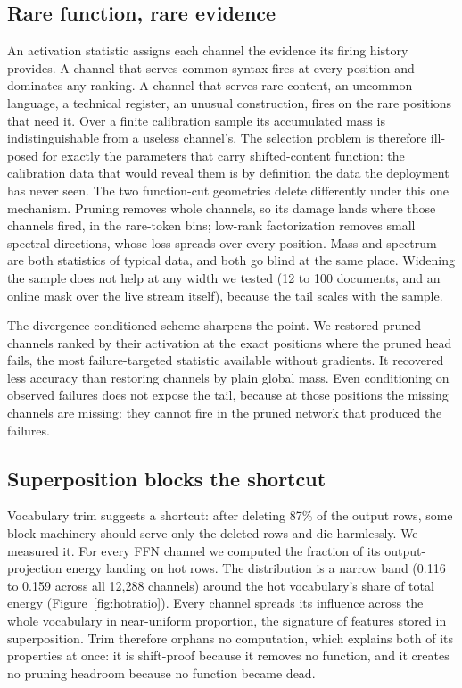 \documentclass{article}
\begin{document}
\subsection{Rare function, rare evidence}
\label{sec:rare}

An activation statistic assigns each channel the evidence its firing history provides. A channel that serves common syntax fires at every position and dominates any ranking. A channel that serves rare content, an uncommon language, a technical register, an unusual construction, fires on the rare positions that need it. Over a finite calibration sample its accumulated mass is indistinguishable from a useless channel's. The selection problem is therefore ill-posed for exactly the parameters that carry shifted-content function: the calibration data that would reveal them is by definition the data the deployment has never seen. The two function-cut geometries delete differently under this one mechanism. Pruning removes whole channels, so its damage lands where those channels fired, in the rare-token bins; low-rank factorization removes small spectral directions, whose loss spreads over every position. Mass and spectrum are both statistics of typical data, and both go blind at the same place. Widening the sample does not help at any width we tested (12 to 100 documents, and an online mask over the live stream itself), because the tail scales with the sample.

The divergence-conditioned scheme sharpens the point. We restored pruned channels ranked by their activation at the exact positions where the pruned head fails, the most failure-targeted statistic available without gradients. It recovered less accuracy than restoring channels by plain global mass. Even conditioning on observed failures does not expose the tail, because at those positions the missing channels are missing: they cannot fire in the pruned network that produced the failures.

\subsection{Superposition blocks the shortcut}
\label{sec:superposition}

Vocabulary trim suggests a shortcut: after deleting 87\% of the output rows, some block machinery should serve only the deleted rows and die harmlessly. We measured it. For every FFN channel we computed the fraction of its output-projection energy landing on hot rows. The distribution is a narrow band (0.116 to 0.159 across all 12,288 channels) around the hot vocabulary's share of total energy (Figure~\ref{fig:hotratio}). Every channel spreads its influence across the whole vocabulary in near-uniform proportion, the signature of features stored in superposition. Trim therefore orphans no computation, which explains both of its properties at once: it is shift-proof because it removes no function, and it creates no pruning headroom because no function became dead.
\end{document}
